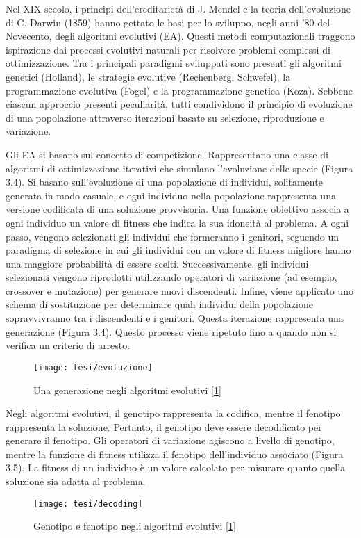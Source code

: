 Nel XIX secolo, i principi dell'ereditarietà di J. Mendel e la teoria dell'evoluzione di C. Darwin (1859) hanno gettato le basi per lo sviluppo, negli anni '80 del Novecento, degli algoritmi evolutivi (EA). Questi metodi computazionali traggono ispirazione dai processi evolutivi naturali per risolvere problemi complessi di ottimizzazione. Tra i principali paradigmi sviluppati sono presenti gli algoritmi genetici (Holland), le strategie evolutive (Rechenberg, Schwefel), la programmazione evolutiva (Fogel) e la programmazione genetica (Koza). Sebbene ciascun approccio presenti peculiarità, tutti condividono il principio di evoluzione di una popolazione attraverso iterazioni basate su selezione, riproduzione e variazione. 

Gli EA si basano sul concetto di competizione. Rappresentano una classe di algoritmi di ottimizzazione iterativi che simulano l'evoluzione delle specie (Figura 3.4). Si basano sull'evoluzione di una popolazione di individui, solitamente generata in modo casuale, e ogni individuo nella popolazione rappresenta una versione codificata di una soluzione provvisoria. Una funzione obiettivo associa a ogni individuo un valore di fitness che indica la sua idoneità al problema. A ogni passo, vengono selezionati gli individui che formeranno i genitori, seguendo un paradigma di selezione in cui gli individui con un valore di fitness migliore hanno una maggiore probabilità di essere scelti. Successivamente, gli individui selezionati vengono riprodotti utilizzando operatori di variazione (ad esempio, crossover e mutazione) per generare nuovi discendenti. Infine, viene applicato uno schema di sostituzione per determinare quali individui della popolazione sopravvivranno tra i discendenti e i genitori. Questa iterazione rappresenta una generazione (Figura 3.4). Questo processo viene ripetuto fino a quando non si verifica un criterio di arresto.
\hypertarget{img4}{}
\begin{figure}[!ht] 
    \centering 
    \texttt{[image: tesi/evoluzione]} 
    \caption[Una generazione negli algoritmi evolutivi]{Una generazione negli algoritmi evolutivi [\hyperlink{bibliografia}{1}]}
\end{figure}

Negli algoritmi evolutivi, il genotipo rappresenta la codifica, mentre il fenotipo rappresenta la soluzione. Pertanto, il genotipo deve essere decodificato per generare il fenotipo. Gli operatori di variazione agiscono a livello di genotipo, mentre la funzione di fitness utilizza il fenotipo dell'individuo associato (Figura 3.5). La fitness di un individuo è un valore calcolato per misurare quanto quella soluzione sia adatta al problema. 
\hypertarget{img5}{}
\begin{figure}[!ht] 
    \centering 
    \texttt{[image: tesi/decoding]} 
    \caption[Genotipo e fenotipo negli algoritmi evolutivi]{Genotipo e fenotipo negli algoritmi evolutivi [\hyperlink{bibliografia}{1}]}
\end{figure}

